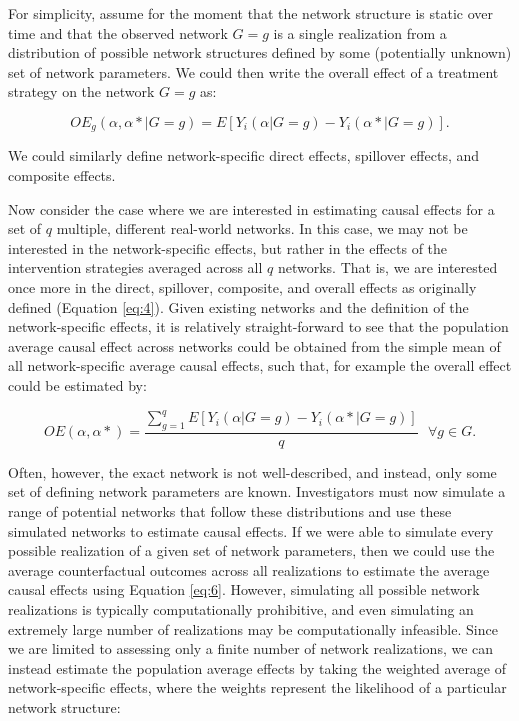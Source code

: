 \documentclass{article}
\theoremstyle{definition}
\begin{document}
For simplicity, assume for the moment that the network structure is static over time and that the observed network $G =g$ is a single realization from a distribution of possible network structures defined by some (potentially unknown) set of network parameters. We could then write the overall effect of a treatment strategy on the network $G=g$ as:

\begin{equation}\label{eq:5}
   OE_{g}\left(\alpha,\alpha* |G=g \right) = E[Y_{i}\left(\alpha|G=g\right) - Y_{i}\left(\alpha*|G=g\right)].	
\end{equation}

We could similarly define network-specific direct effects, spillover effects, and composite effects.

Now consider the case where we are interested in estimating causal effects for a set of $q$ multiple, different real-world networks. In this case, we may not be interested in the network-specific effects, but rather in the effects of the intervention strategies averaged across all $q$ networks. That is, we are interested once more in the direct, spillover, composite, and overall effects as originally defined \cite{hudgens_toward_2008} (Equation \ref{eq:4}). Given existing networks and the definition of the network-specific effects, it is relatively straight-forward to see that the population average causal effect across networks could be obtained from the simple mean of all network-specific average causal effects, such that, for example the overall effect could be estimated by:

\begin{equation}\label{eq:6}
   OE\left(\alpha,\alpha* \right) = \frac{\sum_{g=1}^qE\left[Y_{i}\left(\alpha|G=g\right) - Y_{i}\left(\alpha*|G=g\right)\right]}{q} \text{   
 }\forall g \in G.	
\end{equation}


Often, however, the exact network is not well-described, and instead, only some set of defining network parameters are known. Investigators must now simulate a range of potential networks that follow these distributions and use these simulated networks to estimate causal effects. If we were able to simulate every possible realization of a given set of network parameters, then we could use the average counterfactual outcomes across all realizations to estimate the average causal effects using Equation \ref{eq:6}. However, simulating all possible network realizations is typically computationally prohibitive, and even simulating an extremely large number of realizations may be computationally infeasible. Since we are limited to assessing only a finite number of network realizations, we can instead estimate the population average effects by taking the weighted average of network-specific effects, where the weights represent the likelihood of a particular network structure:
\end{document}
